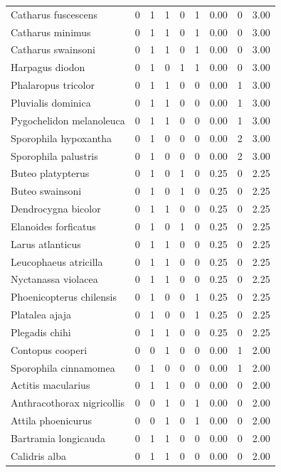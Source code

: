 \documentclass[
]{scrbook}
\begin{document}
\begin{table}
\begin{tabular}{lrrrrrrrr}
Catharus fuscescens & 0 & 1 & 1 & 0 & 1 & 0.00 & 0 & 3.00\\
\addlinespace
Catharus minimus & 0 & 1 & 1 & 0 & 1 & 0.00 & 0 & 3.00\\
Catharus swainsoni & 0 & 1 & 1 & 0 & 1 & 0.00 & 0 & 3.00\\
Harpagus diodon & 0 & 1 & 0 & 1 & 1 & 0.00 & 0 & 3.00\\
Phalaropus tricolor & 0 & 1 & 1 & 0 & 0 & 0.00 & 1 & 3.00\\
Pluvialis dominica & 0 & 1 & 1 & 0 & 0 & 0.00 & 1 & 3.00\\
\addlinespace
Pygochelidon melanoleuca & 0 & 1 & 1 & 0 & 0 & 0.00 & 1 & 3.00\\
Sporophila hypoxantha & 0 & 1 & 0 & 0 & 0 & 0.00 & 2 & 3.00\\
Sporophila palustris & 0 & 1 & 0 & 0 & 0 & 0.00 & 2 & 3.00\\
Buteo platypterus & 0 & 1 & 0 & 1 & 0 & 0.25 & 0 & 2.25\\
Buteo swainsoni & 0 & 1 & 0 & 1 & 0 & 0.25 & 0 & 2.25\\
\addlinespace
Dendrocygna bicolor & 0 & 1 & 1 & 0 & 0 & 0.25 & 0 & 2.25\\
Elanoides forficatus & 0 & 1 & 0 & 1 & 0 & 0.25 & 0 & 2.25\\
Larus atlanticus & 0 & 1 & 1 & 0 & 0 & 0.25 & 0 & 2.25\\
Leucophaeus atricilla & 0 & 1 & 1 & 0 & 0 & 0.25 & 0 & 2.25\\
Nyctanassa violacea & 0 & 1 & 1 & 0 & 0 & 0.25 & 0 & 2.25\\
\addlinespace
Phoenicopterus chilensis & 0 & 1 & 0 & 0 & 1 & 0.25 & 0 & 2.25\\
Platalea ajaja & 0 & 1 & 0 & 0 & 1 & 0.25 & 0 & 2.25\\
Plegadis chihi & 0 & 1 & 1 & 0 & 0 & 0.25 & 0 & 2.25\\
Contopus cooperi & 0 & 0 & 1 & 0 & 0 & 0.00 & 1 & 2.00\\
Sporophila cinnamomea & 0 & 1 & 0 & 0 & 0 & 0.00 & 1 & 2.00\\
\addlinespace
Actitis macularius & 0 & 1 & 1 & 0 & 0 & 0.00 & 0 & 2.00\\
Anthracothorax nigricollis & 0 & 0 & 1 & 0 & 1 & 0.00 & 0 & 2.00\\
Attila phoenicurus & 0 & 0 & 1 & 0 & 1 & 0.00 & 0 & 2.00\\
Bartramia longicauda & 0 & 1 & 1 & 0 & 0 & 0.00 & 0 & 2.00\\
Calidris alba & 0 & 1 & 1 & 0 & 0 & 0.00 & 0 & 2.00\\

\end{tabular}
\end{table}
\end{document}
